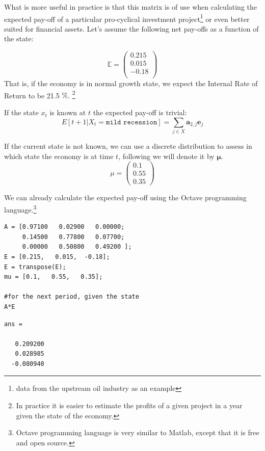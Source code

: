 \documentclass[a4paper,12pt]{article}
\theoremstyle{definition}
\begin{document}
What is more useful in practice is that this matrix is of use when calculating the expected pay-off of a particular pro-cyclical investment project\footnote{data from the upstream oil industry as an example} or even better suited for financial assets. Let's assume the following net pay-offs as a function of the state:

\begin{equation*}
\mathbb{E} = \left( \begin{array}{c}
0.215 \\
0.015 \\ 
-0.18 \\
\end{array} \right)
\end{equation*}
That is, if the economy is in normal growth state, we expect the Internal Rate of Return to be 21.5 $\%$. \footnote{In practice it is easier to estimate the profits of a given project in a year given the state of the economy.}

If the state $x_t$ is known at $t$  the expected pay-off is trivial:
\begin{equation*}
E[t+1 | X_t= \texttt{mild recession}] = \sum_{j \in X} \mathbf{a}_{2,j}\mathbf{e}_j
\end{equation*}

If the current state is not known, we can use a discrete distribution to assess in which state the economy is at time $t$, following \citep{Lozovanu15} we will denote it by $\mathbf{\mu}$.
\begin{equation*}
\mu = \left( \begin{array}{c} 
0.1 \\
0.55 \\
0.35
\end{array} \right)
\end{equation*}

We can already calculate the expected pay-off using the Octave programming language.\footnote{Octave programming language is very similar to Matlab, except that it is free and open source.}


\begin{lstlisting}
A = [0.97100   0.02900   0.00000;
     0.14500   0.77800   0.07700;
     0.00000   0.50800   0.49200 ];
E = [0.215,   0.015,  -0.18];
E = transpose(E);    
mu = [0.1,   0.55,   0.35];

#for the next period, given the state
A*E
\end{lstlisting}

\begin{verbatim}
ans =

   0.209200
   0.028985
  -0.080940
\end{verbatim}
\end{document}

